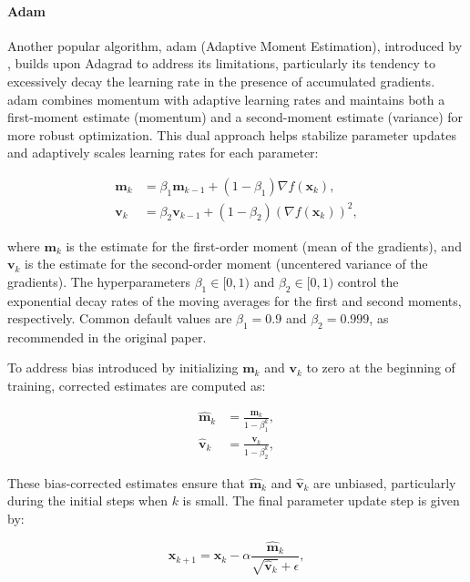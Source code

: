 \paragraph{Adam}
\label{paragraph:adam}
Another popular algorithm, \ac{adam} (Adaptive Moment Estimation), introduced by \citet{kingma2014adam}, builds upon Adagrad to address its limitations, particularly its tendency to excessively decay the learning rate in the presence of accumulated gradients. \ac{adam} combines momentum with adaptive learning rates and maintains both a first-moment estimate (momentum) and a second-moment estimate (variance) for more robust optimization. This dual approach helps stabilize parameter updates and adaptively scales learning rates for each parameter:

\begin{align}
\mathbf{m}_k &= \beta_1 \mathbf{m}_{k-1} + (1 - \beta_1) \nabla f(\mathbf{x}_k), \\  
\mathbf{v}_k &= \beta_2 \mathbf{v}_{k-1} + (1 - \beta_2) (\nabla f(\mathbf{x}_k))^2,
\end{align}

\noindent where $\mathbf{m}_k$ is the estimate for the first-order moment (mean of the gradients), and $\mathbf{v}_k$ is the estimate for the second-order moment (uncentered variance of the gradients). The hyperparameters $\beta_1 \in [0, 1)$ and $\beta_2 \in [0, 1)$ control the exponential decay rates of the moving averages for the first and second moments, respectively. Common default values are $\beta_1 = 0.9$ and $\beta_2 = 0.999$, as recommended in the original paper. 

To address bias introduced by initializing $\mathbf{m}_k$ and $\mathbf{v}_k$ to zero at the beginning of training, corrected estimates are computed as:

\begin{align}
    \hat{\mathbf{m}}_k &= \frac{\mathbf{m}_k}{1-\beta_1^k}, \\  
    \hat{\mathbf{v}}_k &= \frac{\mathbf{v}_k}{1-\beta_2^k},
\end{align}

\noindent These bias-corrected estimates ensure that $\hat{\mathbf{m}}_k$ and $\hat{\mathbf{v}}_k$ are unbiased, particularly during the initial steps when $k$ is small. The final parameter update step is given by:

\begin{equation}
\mathbf{x}_{k+1} = \mathbf{x}_k - \alpha \frac{\hat{\mathbf{m}}_k}{\sqrt{\hat{\mathbf{v}}_k} + \epsilon},
\end{equation}

